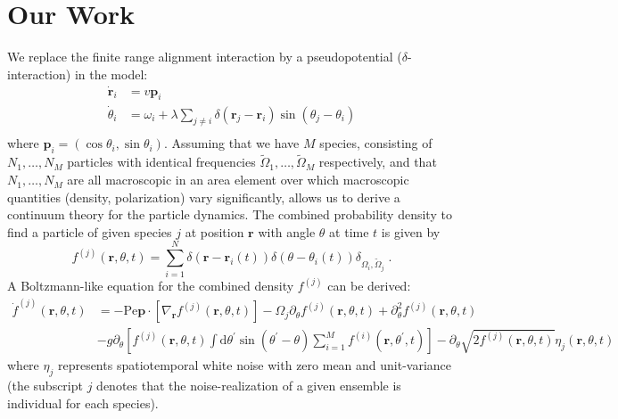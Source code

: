 \documentclass{article}
\begin{document}
\section{Our Work}
We replace the finite range alignment interaction by a pseudopotential ($\delta$-interaction) in the model:
\begin{equation}
    \label{eq:ourModel}
    \begin{aligned}
        \dot{\mathbf{r}}_i&=v\mathbf{p}_i\\
        \dot{\theta}_i&=\omega _i+\lambda \sum_{j\ne i}{\delta}\left( \mathbf{r}_j-\mathbf{r}_i \right) \sin \left( \theta _j-\theta _i \right)\\
    \end{aligned}
\end{equation}
where $\mathbf{p}_i=(\cos\theta_i, \sin\theta_i)$. 
Assuming that we have $M$ species, consisting of $N_1, \dots, N_M$ particles with identical frequencies $\tilde{\Omega}_1, \dots, \tilde{\Omega}_M$ respectively, and that $N_1, \dots, N_M$ are all macroscopic in an area element over which macroscopic quantities (density, polarization) vary significantly, allows us to derive a continuum theory for the particle dynamics.
The combined probability density to find a particle of given species $j$ at position $\mathbf{r}$ with angle $\theta$ at time $t$ is given by
\begin{equation}
    \label{eq:combinedDensity}
    f^{\left( j \right)}\left( \mathbf{r},\theta ,t \right) =\sum_{i=1}^N{\delta \left( \mathbf{r}-\mathbf{r}_i\left( t \right) \right) \delta \left( \theta -\theta _i\left( t \right) \right) \delta _{\Omega _i,\tilde{\Omega}_j}}\;.
\end{equation}
A Boltzmann-like equation for the combined density $f^{\left( j \right)}$ can be derived:
\begin{equation}
    \label{eq:combinedDensityDynamics}
    \begin{aligned}
        \dot{f}^{(j)}(\mathbf{r},\theta,t)& = -\mathrm{Pe} \mathbf{p}\cdot\left[\nabla_\mathbf{r}f^{(j)}(\mathbf{r},\theta,t)\right]-\Omega_j\partial_\theta f^{(j)}(\mathbf{r},\theta,t)+\partial_\theta^2f^{(j)}(\mathbf{r},\theta,t) 
        \\
        &- g\partial_\theta\left[f^{(j)}(\mathbf{r},\theta,t)\int\mathrm{d}\theta^{\prime}\sin(\theta^{\prime}-\theta)\sum_{i=1}^Mf^{(i)}(\mathbf{r},\theta^{\prime},t)\right]-\partial_\theta\sqrt{2f^{(j)}(\mathbf{r},\theta,t)}\eta_j(\mathbf{r},\theta,t)
    \end{aligned}
\end{equation}
where $\eta_j$ represents spatiotemporal white noise with zero mean and unit-variance (the subscript $j$ denotes that the noise-realization of a given ensemble is individual for each species).
\end{document}

